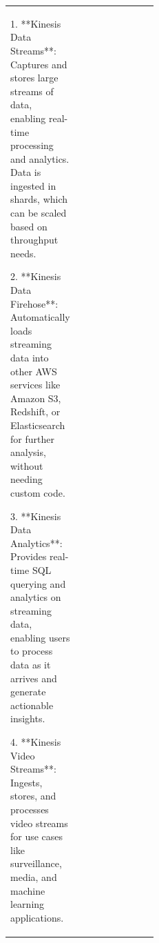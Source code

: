 \documentclass[11pt,paper=a4]{scrbook}
\begin{document}
\begin{longtable}{ | p{0.1\linewidth} | p{.6\linewidth}|p{0.15\linewidth}}
1. **Kinesis Data Streams**: Captures and stores large streams of data, 
enabling real-time processing and analytics. Data is ingested in shards, which can be scaled based on throughput needs.

2. **Kinesis Data Firehose**: Automatically loads streaming data into other 
AWS services like Amazon S3, Redshift, or Elasticsearch for further analysis, 
without needing custom code.

3. **Kinesis Data Analytics**: Provides real-time SQL querying and analytics on 
streaming data, enabling users to process data as it arrives and generate actionable insights.

4. **Kinesis Video Streams**: Ingests, stores, and processes video streams for use cases 
like surveillance, media, and machine learning applications.


\end{longtable}
\end{document}
